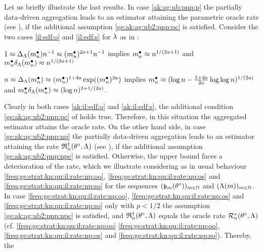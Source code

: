 \begin{il}\label{ak:ag:ub:pnp:il}Let us briefly illustrate the last
  results. In case \ref{ak:ag:ub:pnp:p} the partially data-driven aggregation leads
  to an estimator attaining the parametric oracle rate (see
  ), if the additional assumption
  \ref{ge:ak:ag:ub2:pnp:pc} is satisfied.  Consider  the two cases \ref{il:edf:o} and
  \ref{il:edf:s} for $\edf$ as in :
\begin{Liste}[]
\item[\mylabel{ak:il:edf:o}{\dg\bfseries{(o)}}]   $1\approx\DipenSv[\sDi{\ssY}]\ssY^{-1}\approx(\sDi{\ssY})^{2a+1}\ssY^{-1}$   implies $\sDi{\ssY}\approx\ssY^{1/(2a+1)}$ and
    $\sDi{\ssY}\cmSv[\sDi{\ssY}]\approx\ssY^{1/(2a+1)}$
\item[\mylabel{ak:il:edf:s}{\dg\bfseries{(s)}}]  $\ssY\approx\DipenSv[\sDi{\ssY}]\approx
    (\sDi{\ssY})^{1+4a}\exp((\sDi{\ssY})^{2a})$ implies
    $\sDi{\ssY}\approx(\log
    \ssY-\tfrac{1+4a}{2a}\log\log\ssY)^{1/(2a)}$ and 
    $\sDi{\ssY}\cmSv[\sDi{\ssY}]\approx (\log \ssY)^{2+1/(2a)}$.
  \end{Liste}
  Clearly in both cases \ref{ak:il:edf:o} and \ref{ak:il:edf:s}, the
  additional condition \ref{ge:ak:ag:ub2:pnp:pc} of 
  holds true. Therefore, in this situation the aggregated estimator
  attains the oracle rate.  On the other hand side, in case
  \ref{ge:ak:ag:ub2:pnp:np} the partially data-driven aggregation leads
  to an estimator attaining the rate $\naRa{(\xdf,\Lambda)}$ (see
  ), if the additional assumption
  \ref{ge:ak:ag:ub2:pnp:npc} is satisfied. Otherwise, the upper bound
  faces a deterioration of the rate, which we illustrate considering as
  in  usual behaviour \ref{freq:ge:strat:kn:qu:il:rate:np:oo},
  \ref{freq:ge:strat:kn:qu:il:rate:np:os} and \ref{freq:ge:strat:kn:qu:il:rate:np:so} for the
  sequences $\Nsuite[\Di]{\bias[\Di](\xdf)}$ and
  $\Nsuite[\Di]{\iSv[\Di]}$. In case \ref{freq:ge:strat:kn:qu:il:rate:np:oo},
  \ref{freq:ge:strat:kn:qu:il:rate:np:os} and \ref{freq:ge:strat:kn:qu:il:rate:np:so} only with
  $p<1/2$ the assumption \ref{ge:ak:ag:ub2:pnp:npc} is satisfied, and
  $\naRa{(\xdf,\Lambda)}$ equals the oracle rate $\oRa{\xdf,\Lambda}$ (cf.
  \ref{freq:ge:strat:kn:qu:il:rate:np:oo} \ref{freq:ge:strat:kn:qu:il:rate:np:oo},
  \ref{freq:ge:strat:kn:qu:il:rate:np:os} and \ref{freq:ge:strat:kn:qu:il:rate:np:so}). Thereby, the

\end{il}
